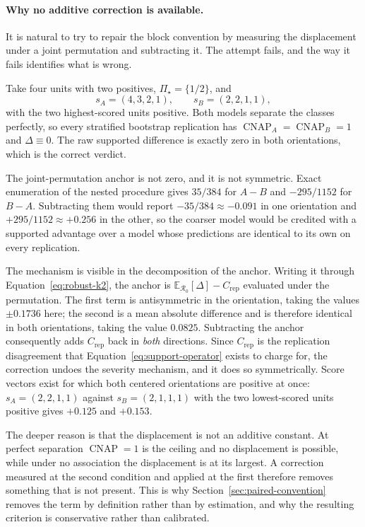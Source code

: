 \documentclass[11pt]{article}
\newcommand{\CNAP}{\operatorname{CNAP}}
\newcommand{\Regime}{\mathcal{R}}
\newcommand{\PSet}{\Pi_\star}
\newcommand{\E}{\mathbb{E}}
\theoremstyle{remark}
\begin{document}
\paragraph{Why no additive correction is available.}
It is natural to try to repair the block convention by measuring the displacement under a joint permutation and subtracting it. The attempt fails, and the way it fails identifies what is wrong.

Take four units with two positives, $\PSet=\{1/2\}$, and
\[
s_A=(4,3,2,1),
\qquad
s_B=(2,2,1,1),
\]
with the two highest-scored units positive. Both models separate the classes perfectly, so every stratified bootstrap replication has $\CNAP_A=\CNAP_B=1$ and $\Delta\equiv0$. The raw supported difference is exactly zero in both orientations, which is the correct verdict.

The joint-permutation anchor is not zero, and it is not symmetric. Exact enumeration of the nested procedure gives $35/384$ for $A-B$ and $-295/1152$ for $B-A$. Subtracting them would report $-35/384\approx-0.091$ in one orientation and $+295/1152\approx+0.256$ in the other, so the coarser model would be credited with a supported advantage over a model whose predictions are identical to its own on every replication.

The mechanism is visible in the decomposition of the anchor. Writing it through Equation~\eqref{eq:robust-k2}, the anchor is $\E_{\Regime_0}[\Delta]-C_{\mathrm{rep}}$ evaluated under the permutation. The first term is antisymmetric in the orientation, taking the values $\pm0.1736$ here; the second is a mean absolute difference and is therefore identical in both orientations, taking the value $0.0825$. Subtracting the anchor consequently adds $C_{\mathrm{rep}}$ back in \emph{both} directions. Since $C_{\mathrm{rep}}$ is the replication disagreement that Equation~\eqref{eq:support-operator} exists to charge for, the correction undoes the severity mechanism, and it does so symmetrically. Score vectors exist for which both centered orientations are positive at once: $s_A=(2,2,1,1)$ against $s_B=(2,1,1,1)$ with the two lowest-scored units positive gives $+0.125$ and $+0.153$.

The deeper reason is that the displacement is not an additive constant. At perfect separation $\CNAP=1$ is the ceiling and no displacement is possible, while under no association the displacement is at its largest. A correction measured at the second condition and applied at the first therefore removes something that is not present. This is why Section~\ref{sec:paired-convention} removes the term by definition rather than by estimation, and why the resulting criterion is conservative rather than calibrated.
\end{document}
